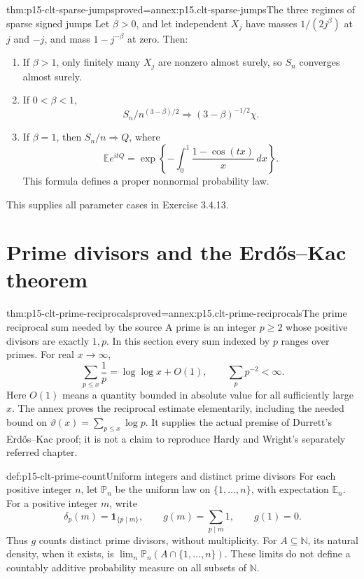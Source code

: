 \begin{hbtheorem}{thm:p15-clt-sparse-jumps}{proved=annex:p15.clt-sparse-jumps}{The three regimes of sparse signed jumps}
Let \(\beta>0\), and let independent \(X_j\) have masses
\(1/(2j^\beta)\) at \(j\) and \(-j\), and mass \(1-j^{-\beta}\)
at zero. Then:
\begin{enumerate}
\item If \(\beta>1\), only finitely many \(X_j\) are nonzero
 almost surely, so \(S_n\) converges almost surely.
\item If \(0<\beta<1\),
 \[
  S_n/n^{(3-\beta)/2}\Rightarrow(3-\beta)^{-1/2}\chi.
 \]
\item If \(\beta=1\), then \(S_n/n\Rightarrow Q\), where
 \[
 \mathbb Ee^{itQ}
  =\exp\left\{-\int_0^1\frac{1-\cos(tx)}x\,dx\right\}.
 \]
 This formula defines a proper nonnormal probability law.
\end{enumerate}
This supplies all parameter cases in Exercise 3.4.13.
\end{hbtheorem}

\section{Prime divisors and the Erd\H{o}s--Kac theorem}
\label{sec:p15-clt-prime-divisors}

\begin{hblemma}{thm:p15-clt-prime-reciprocals}{proved=annex:p15.clt-prime-reciprocals}{The prime reciprocal sum needed by the source}
A prime is an integer \(p\geq2\) whose positive divisors are
exactly \(1,p\). In this section every sum indexed by \(p\)
ranges over primes. For real \(x\to\infty\),
\[
 \sum_{p\leq x}\frac1p=\log\log x+O(1),\qquad
 \sum_p p^{-2}<\infty.
 \]
Here \(O(1)\) means a quantity bounded in absolute value for all
sufficiently large \(x\). The annex proves the reciprocal estimate
elementarily, including the needed bound on
\(\vartheta(x)=\sum_{p\leq x}\log p\).
It supplies the actual premise of Durrett's Erd\H{o}s--Kac proof;
it is not a claim to reproduce Hardy and Wright's separately
referred chapter.
\end{hblemma}

\begin{hbdefinition}{def:p15-clt-prime-count}{Uniform integers and distinct prime divisors}
For each positive integer \(n\), let \(\mathbb P_n\) be the
uniform law on \(\{1,\ldots,n\}\), with expectation \(\mathbb E_n\).
For a positive integer \(m\), write
\[
 \delta_p(m)=\mathbf1_{\{p\mid m\}},\qquad
 g(m)=\sum_{p\mid m}1,\qquad g(1)=0.
 \]
Thus \(g\) counts distinct prime divisors, without multiplicity.
For \(A\subseteq\mathbb N\), its natural density, when it exists,
is \(\lim_n\mathbb P_n(A\cap\{1,\ldots,n\})\).
These limits do not define a countably additive probability
measure on all subsets of \(\mathbb N\).
\end{hbdefinition}

